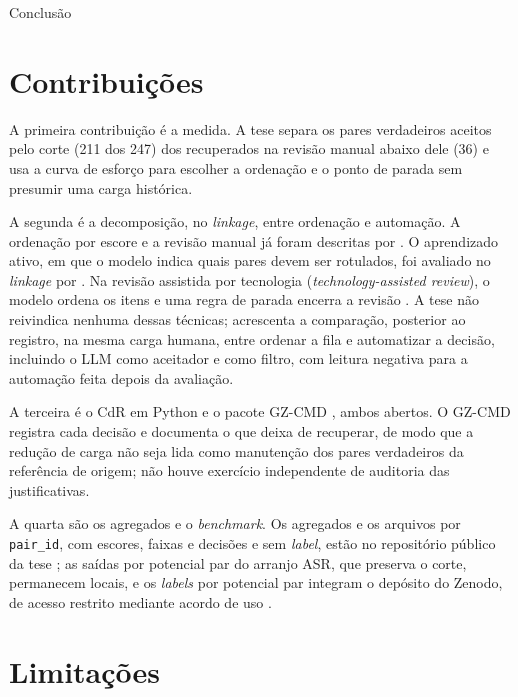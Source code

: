\begin{chapter}{Conclusão}
\section{Contribuições}\label{sec:concl-contribuicoes}

A primeira contribuição é a medida. A tese separa os pares verdadeiros aceitos pelo corte (211 dos 247) dos recuperados na revisão manual abaixo dele (36) e usa a curva de esforço para escolher a ordenação e o ponto de parada sem presumir uma carga histórica.

A segunda é a decomposição, no \textit{linkage}, entre ordenação e automação. A ordenação por escore e a revisão manual já foram descritas por . O aprendizado ativo, em que o modelo indica quais pares devem ser rotulados, foi avaliado no \textit{linkage} por . Na revisão assistida por tecnologia (\textit{technology-assisted review}), o modelo ordena os itens e uma regra de parada encerra a revisão \cite{Callaghan2020stopping,Lewis2021certifying}. A tese não reivindica nenhuma dessas técnicas; acrescenta a comparação, posterior ao registro, na mesma carga humana, entre ordenar a fila e automatizar a decisão, incluindo o LLM como aceitador e como filtro, com leitura negativa para a automação feita depois da avaliação.

A terceira é o CdR em Python \cite{Jardim2025comparador} e o pacote GZ-CMD \cite{Jardim2026gzcmd}, ambos abertos. O GZ-CMD registra cada decisão e documenta o que deixa de recuperar, de modo que a redução de carga não seja lida como manutenção dos pares verdadeiros da referência de origem; não houve exercício independente de auditoria das justificativas.

A quarta são os agregados e o \textit{benchmark}. Os agregados e os arquivos por \texttt{pair\_id}, com escores, faixas e decisões e sem \textit{label}, estão no repositório público da tese \cite{Jardim2026phdrepo}; as saídas por potencial par do arranjo ASR, que preserva o corte, permanecem locais, e os \textit{labels} por potencial par integram o depósito do Zenodo, de acesso restrito mediante acordo de uso \cite{Jardim2026zenodoGzcmd}.

\section{Limitações}\label{sec:concl-limitacoes}


\end{chapter}
